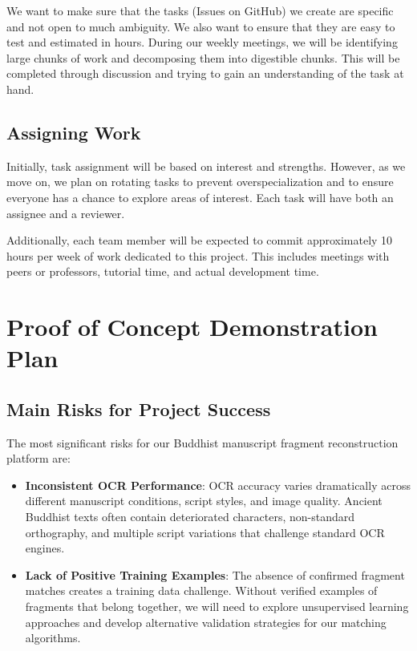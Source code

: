\documentclass{article}
\begin{document}
\noindent
We want to make sure that the tasks (Issues on GitHub) we create are specific and not open to much ambiguity. We also want to ensure that they are easy to test and estimated in hours. During our weekly meetings, we will be identifying large chunks of work and decomposing them into digestible chunks. This will be completed through discussion and trying to gain an understanding of the task at hand.

\subsection*{Assigning Work}
Initially, task assignment will be based on interest and strengths. However, as we move on, we plan on rotating tasks to prevent overspecialization and to ensure everyone has a chance to explore areas of interest. Each task will have both an assignee and a reviewer.

\noindent
Additionally, each team member will be expected to commit approximately 10 hours per week of work dedicated to this project. This includes meetings with peers or professors, tutorial time, and actual development time.


\section{Proof of Concept Demonstration Plan}

\subsection{Main Risks for Project Success}

The most significant risks for our Buddhist manuscript fragment reconstruction platform are:

\begin{itemize}
\item \textbf{Inconsistent OCR Performance}: OCR accuracy varies dramatically across different manuscript conditions, script styles, and image quality. Ancient Buddhist texts often contain deteriorated characters, non-standard orthography, and multiple script variations that challenge standard OCR engines.


\item \textbf{Lack of Positive Training Examples}: The absence of confirmed fragment matches creates a training data challenge. Without verified examples of fragments that belong together, we will need to explore unsupervised learning approaches and develop alternative validation strategies for our matching algorithms.
\end{itemize}
\end{document}
